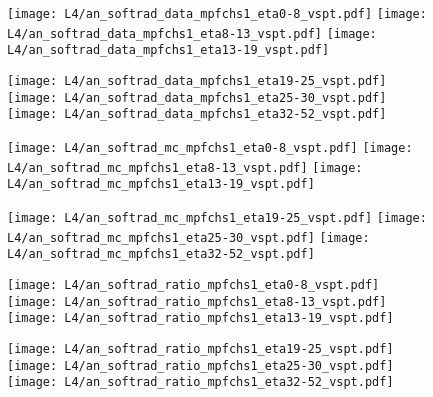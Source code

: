 \documentclass[landscape,10pt]{beamer} %
\begin{document}
{\newpage

\begin{figure}[p]
\centering
  \texttt{[image: L4/an\_softrad\_data\_mpfchs1\_eta0-8\_vspt.pdf]}
  \texttt{[image: L4/an\_softrad\_data\_mpfchs1\_eta8-13\_vspt.pdf]}
  \texttt{[image: L4/an\_softrad\_data\_mpfchs1\_eta13-19\_vspt.pdf]}
\end{figure}
\begin{figure}[p]
\centering
  \texttt{[image: L4/an\_softrad\_data\_mpfchs1\_eta19-25\_vspt.pdf]}
  \texttt{[image: L4/an\_softrad\_data\_mpfchs1\_eta25-30\_vspt.pdf]}
  \texttt{[image: L4/an\_softrad\_data\_mpfchs1\_eta32-52\_vspt.pdf]}
\end{figure}

\newpage

\begin{figure}[p]
\centering
  \texttt{[image: L4/an\_softrad\_mc\_mpfchs1\_eta0-8\_vspt.pdf]}
  \texttt{[image: L4/an\_softrad\_mc\_mpfchs1\_eta8-13\_vspt.pdf]}
  \texttt{[image: L4/an\_softrad\_mc\_mpfchs1\_eta13-19\_vspt.pdf]}
\end{figure}
\begin{figure}[p]
\centering
  \texttt{[image: L4/an\_softrad\_mc\_mpfchs1\_eta19-25\_vspt.pdf]}
  \texttt{[image: L4/an\_softrad\_mc\_mpfchs1\_eta25-30\_vspt.pdf]}
  \texttt{[image: L4/an\_softrad\_mc\_mpfchs1\_eta32-52\_vspt.pdf]}
\end{figure}

\newpage

\begin{figure}[p]
\centering
  \texttt{[image: L4/an\_softrad\_ratio\_mpfchs1\_eta0-8\_vspt.pdf]}
  \texttt{[image: L4/an\_softrad\_ratio\_mpfchs1\_eta8-13\_vspt.pdf]}
  \texttt{[image: L4/an\_softrad\_ratio\_mpfchs1\_eta13-19\_vspt.pdf]}
\end{figure}
\begin{figure}[p]
\centering
  \texttt{[image: L4/an\_softrad\_ratio\_mpfchs1\_eta19-25\_vspt.pdf]}
  \texttt{[image: L4/an\_softrad\_ratio\_mpfchs1\_eta25-30\_vspt.pdf]}
  \texttt{[image: L4/an\_softrad\_ratio\_mpfchs1\_eta32-52\_vspt.pdf]}
\end{figure}

}
\end{document}
